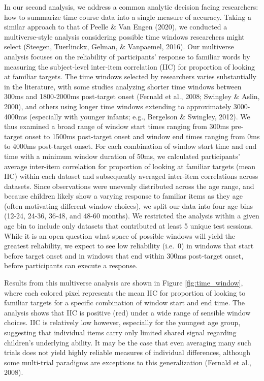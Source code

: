 \documentclass[10pt, letterpaper]{article}
\begin{document}
In our second analysis, we address a common analytic decision facing
researchers: how to summarize time course data into a single measure of
accuracy. Taking a similar approach to that of Peelle \& Van Engen
(2020), we conducted a multiverse-style analysis considering possible
time windows researchers might select (Steegen, Tuerlinckx, Gelman, \&
Vanpaemel, 2016). Our multiverse analysis focuses on the reliability of
participants' response to familiar words by measuring the subject-level
inter-item correlation (IIC) for proportion of looking at familiar
targets. The time windows selected by researchers varies substantially
in the literature, with some studies analyzing shorter time windows
between 300ms and 1800-2000ms post-target onset (Fernald et al., 2008;
Swingley \& Aslin, 2000), and others using longer time windows extending
to approximately 3000-4000ms (especially with younger infants; e.g.,
Bergelson \& Swingley, 2012). We thus examined a broad range of window
start times ranging from 300ms pre-target onset to 1500ms post-target
onset and window end times ranging from 0ms to 4000ms post-target onset.
For each combination of window start time and end time with a minimum
window duration of 50ms, we calculated participants' average inter-item
correlation for proportion of looking at familiar targets (mean IIC)
within each dataset and subsequently averaged inter-item correlations
across datasets. Since observations were unevenly distributed across the
age range, and because children likely show a varying response to
familiar items as they age (often motivating different window choices),
we split our data into four age bins (12-24, 24-36, 36-48, and 48-60
months). We restricted the analysis within a given age bin to include
only datasets that contributed at least 5 unique test sessions. While it
is an open question what space of possible windows will yield the
greatest reliability, we expect to see low reliability (i.e.~0) in
windows that start before target onset and in windows that end within
300ms post-target onset, before participants can execute a response.

Results from this multiverse analysis are shown in Figure
\ref{fig:time_window}, where each colored pixel represents the mean IIC
for proportion of looking to familiar targets for a specific combination
of window start and end time. The analysis shows that IIC is positive
(red) under a wide range of sensible window choices. IIC is relatively
low however, especially for the youngest age group, suggesting that
individual items carry only limited shared signal regarding children's
underlying ability. It may be the case that even averaging many such
trials does not yield highly reliable measures of individual
differences, although some multi-trial paradigms are exceptions to this
generalization (Fernald et al., 2008).
\end{document}
